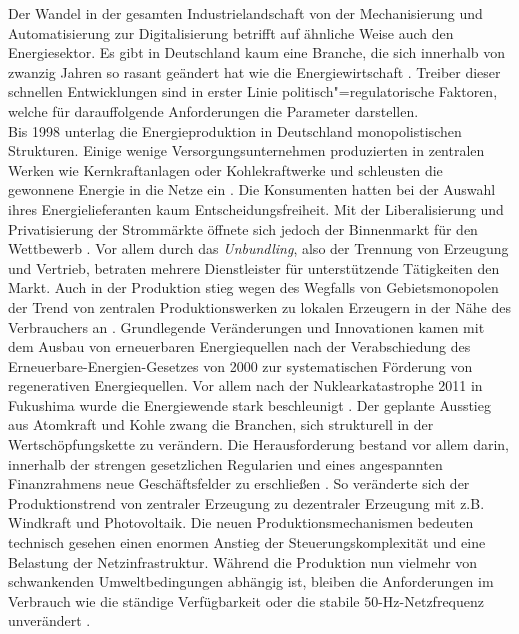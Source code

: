 Der Wandel in der gesamten Industrielandschaft von der Mechanisierung und Automatisierung zur Digitalisierung betrifft auf ähnliche Weise auch den Energiesektor. Es gibt in Deutschland kaum eine Branche, die sich innerhalb von zwanzig Jahren so rasant geändert hat wie die Energiewirtschaft \citep{Doleski2015}. Treiber dieser schnellen Entwicklungen sind in erster Linie politisch"=regulatorische Faktoren, welche für darauffolgende Anforderungen die Parameter darstellen.
\\Bis 1998 unterlag die Energieproduktion in Deutschland monopolistischen Strukturen. Einige wenige Versorgungsunternehmen produzierten in zentralen Werken wie Kernkraftanlagen oder Kohlekraftwerke und schleusten die gewonnene Energie in die Netze ein \citep{Utecht2018}. Die Konsumenten hatten bei der Auswahl ihres Energielieferanten kaum Entscheidungsfreiheit. Mit der Liberalisierung und Privatisierung der Strommärkte öffnete sich jedoch der Binnenmarkt für den Wettbewerb \citep{Doleski2017}. Vor allem durch das \textit{Unbundling}, also der Trennung von Erzeugung und Vertrieb, betraten mehrere Dienstleister für unterstützende Tätigkeiten den Markt. Auch in der Produktion stieg wegen des Wegfalls von Gebietsmonopolen der Trend von zentralen Produktionswerken zu lokalen Erzeugern in der Nähe des Verbrauchers an \citep{Utecht2018}. Grundlegende Veränderungen und Innovationen kamen mit dem Ausbau von erneuerbaren Energiequellen nach der Verabschiedung des Erneuerbare-Energien-Gesetzes von 2000 zur systematischen Förderung von regenerativen Energiequellen. Vor allem nach der Nuklearkatastrophe 2011 in Fukushima wurde die Energiewende stark beschleunigt \citep{Doleski2015}. Der geplante Ausstieg aus Atomkraft und Kohle zwang die Branchen, sich strukturell in der Wertschöpfungskette zu verändern. Die Herausforderung bestand vor allem darin, innerhalb der strengen gesetzlichen Regularien und eines angespannten Finanzrahmens neue Geschäftsfelder zu erschließen \citep{Doleski2015}. So veränderte sich der Produktionstrend von zentraler Erzeugung zu dezentraler Erzeugung mit z.B. Windkraft und Photovoltaik. Die neuen Produktionsmechanismen bedeuten technisch gesehen einen enormen Anstieg der Steuerungskomplexität und eine Belastung der Netzinfrastruktur. Während die Produktion nun vielmehr von schwankenden Umweltbedingungen abhängig ist, bleiben die Anforderungen im Verbrauch wie die ständige Verfügbarkeit oder die stabile 50-Hz-Netzfrequenz unverändert \citep{Utecht2018}.
\\\\
